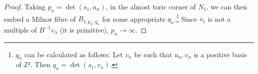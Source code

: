 \documentclass[12pt,a4paper,draft]{scrartcl}
\begin{document}
\begin{proof}
Taking $p_n=\det(s_1,u_n)$, in the almost toric corner of $N_1$, we can then embed a Milnor fibre of $B_{1,p_n,q_n}$ for some appropriate $q_n$.\footnote{$q_n$ can be calculated as follows: Let $v_n$ be such that $u_n, v_n$ is a positive basis of $ℤ²$. Then $q_n = \det(s_1,v_n).$}
Since $s_1$ is not a multiple of $B^{-1}v_λ$ (it is primitive), $p_n → ∞$.
\end{proof}
\end{document}
